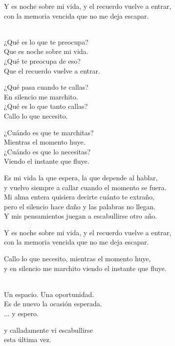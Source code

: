 \begin{lyrics}
Y es noche sobre mi vida, y el recuerdo vuelve a entrar,\\
con la memoria vencida que no me deja escapar.

\\
 ¿Qué es lo que te preocupa?\\
 Que es noche sobre mi vida.\\
 ¿Qué te preocupa de eso?\\
 Que el recuerdo vuelve a entrar.

 ¿Qué pasa cuando te callas?\\
 En silencio me marchito.\\
 ¿Qué es lo que tanto callas?\\
 Callo lo que necesito.

 ¿Cuándo es que te marchitas?\\
 Mientras el momento huye.\\
 ¿Cuándo es que lo necesitas?\\
 Viendo el instante que fluye.

Es mi vida la que espera, la que depende al hablar,\\
y vuelvo siempre a callar cuando el momento se fuera.\\
Mi alma entera quisiera decirte cuánto te extraño,\\
pero el silencio hace daño y las palabras no llegan.\\
Y mis pensamientos juegan a escabullirse otro año.

Y es noche sobre mi vida, y el recuerdo vuelve a entrar,\\
con la memoria vencida que no me deja escapar.

Callo lo que necesito, mientras el momento huye,\\
y en silencio me marchito viendo el instante que fluye.

\\
Un espacio. %
Una oportunidad.\\
Es de nuevo la ocasión esperada.\\
... %
y espero.

y calladamente vi escabullirse\\
esta última vez.

\end{lyrics}

